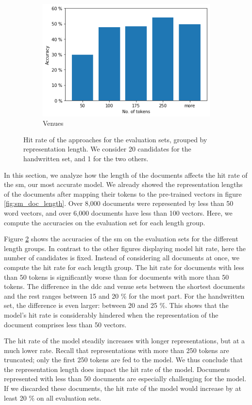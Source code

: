 \begin{figure}
   \begin{subfigure}[t]{.32\textwidth}
    \centering
    \includegraphics[width=\textwidth]{figures/supervised_approach/sm_venue_length.png}
    \caption{Venues}
    \label{fig:sm_venue_length}
  \end{subfigure}
  \caption{Hit rate of the approaches for the evaluation sets, grouped by representation length. We consider 20 candidates for the handwritten set, and 1 for the two others.}
  \label{fig:sm_eval_length}
\end{figure}

In this section, we analyze how the length of the documents affects the hit rate of the \acrshort{sm}, our most accurate model. We already showed the representation lengths of the documents after mapping their tokens to the pre-trained vectors in figure \ref{fig:sm_doc_length}. Over 8,000 documents were represented by less than 50 word vectors, and over 6,000 documents have less than 100 vectors. Here, we compute the accuracies on the evaluation set for each length group.

Figure \ref{fig:sm_eval_length} shows the accuracies of the \acrshort{sm} on the evaluation sets for the different length groups. In contrast to the other figures displaying model hit rate, here the number of candidates is fixed. Instead of considering all documents at once, we compute the hit rate for each length group. The hit rate for documents with less than 50 tokens is significantly worse than for documents with more than 50 tokens. The difference in the \acrshort{ddc} and venue sets between the shortest documents and the rest ranges between 15 and 20 \% for the most part. For the handwritten set, the difference is even larger: between 20 and 25 \%. This shows that the model's hit rate is considerably hindered when the representation of the document comprises less than 50 vectors.

The hit rate of the model steadily increases with longer representations, but at a much lower rate. Recall that representations with more than 250 tokens are truncated; only the first 250 tokens are fed to the model. We thus conclude that the representation length does impact the hit rate of the model. Documents represented with less than 50 documents are especially challenging for the model. If we discarded these documents, the hit rate of the model would increase by at least 20 \% on all evaluation sets.
